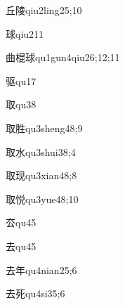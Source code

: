 \begin{verbete}{丘陵}{qiu2ling2}{5;10}
\end{verbete}

\begin{verbete}{球}{qiu2}{11}
\end{verbete}

\begin{verbete}{曲棍球}{qu1gun4qiu2}{6;12;11}
\end{verbete}

\begin{verbete}{驱}{qu1}{7}
\end{verbete}

\begin{verbete}{取}{qu3}{8}
\end{verbete}

\begin{verbete}{取胜}{qu3sheng4}{8;9}
\end{verbete}

\begin{verbete}{取水}{qu3shui3}{8;4}
\end{verbete}

\begin{verbete}{取现}{qu3xian4}{8;8}
\end{verbete}

\begin{verbete}{取悦}{qu3yue4}{8;10}
\end{verbete}

\begin{verbete}{厺}{qu4}{5}
\end{verbete}

\begin{verbete}{去}{qu4}{5}
\end{verbete}

\begin{verbete}{去年}{qu4nian2}{5;6}
\end{verbete}

\begin{verbete}{去死}{qu4si3}{5;6}
\end{verbete}

